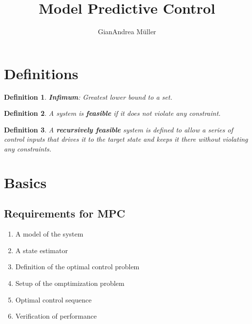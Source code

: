 \documentclass[8pt,a4paper]{scrartcl}
\title{Model Predictive Control}
\author{GianAndrea Müller}
\newtheorem{define}{Definition}
\begin{document}
\begin{multicols*}{3}
\maketitle
\tableofcontents
\end{multicols*}

\newpage

\begin{multicols*}{3}

\setcounter{section}{-1}

\section{Definitions}

\begin{define}
\textbf{Infimum}: Greatest lower bound to a set.
\end{define}

\begin{define}
A system is \textbf{feasible} if it does not violate any constraint.
\end{define}

\begin{define}
A \textbf{recursively feasible} system is defined to allow a series of control inputs that drives it to the target state and keeps it there without violating any constraints.
\end{define}

\section{Basics}
\subsection{Requirements for MPC}
\begin{enumerate}
\ncompaq
\item A model of the system
\item A state estimator
\item Definition of the optimal control problem
\item Setup of the omptimization problem
\item Optimal control sequence
\item Verification of performance
\end{enumerate}
\newcommand{\MPC}{
\mportabflex{lll}{
$U^\ast_k(x(k)):=$&$\argmin$&$\sum\limits_{i=0}^{N-1}l(x_{k+i},u_{k+i})$\\
&subj. to\\
\multicolumn{2}{l}{\small{measurement}}&$x_k=x(k)$\\
\multicolumn{2}{l}{\small{system model}}&$x_{k+i+1}=Ax_{k+i}+Bu_{k+i}$\\
\multicolumn{2}{l}{\small{state constraints}}&$x_{k+i}\in\mathcal{X}$\\
\multicolumn{2}{l}{\small{input constraints}}&$u_{k+i}\in\mathcal{U}$\\
\multicolumn{2}{l}{\small{optimization variables}}&$U_k=\{u_k,u_{k+1},\ldots,u_{k+N-1}\}$
}
}

\end{multicols*}
\end{document}
